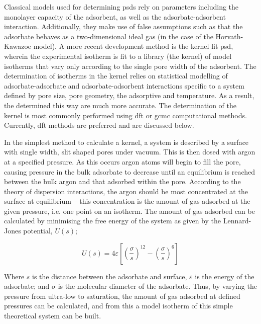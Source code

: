 Classical models used for determining \glspl{psd} rely on parameters including the monolayer capacity of the \gls{adsorbent}, as well as the \gls{adsorbate}-\gls{adsorbent} interaction. Additionally, they make use of false assumptions such as that the \gls{adsorbate} behaves as a two-dimensional ideal gas (in the case of the Horvath-Kawazoe model).\citep{Barrett1951determination, Horvath1983Method}  A more recent development method is the kernel fit \acrshort{psd}, wherein the experimental isotherm is fit to a library (the kernel) of model isotherms that vary only according to the single pore width of the \gls{adsorbent}.\citep{Thommes2015Physisorption, tan1990adsorption, sosin1995using, tarazona1987phase} The determination of isotherms in the kernel relies on statistical modelling of \gls{adsorbate}-\gls{adsorbate} and \gls{adsorbate}-\gls{adsorbent} interactions specific to a system defined by pore size, pore geometry, the adsorptive and temperature. As a result, the  determined this way are much more accurate. The determination of the kernel is most commonly performed using \acrfull{dft} or \acrfull{gcmc} computational methods. Currently, \acrshort{dft} methods are preferred and are discussed below.

In the simplest method to calculate a kernel, a system is described by a surface with single width, slit shaped pores under vacuum. This is then dosed with argon at a specified pressure. As this occurs argon atoms will begin to fill the pore, causing pressure in the bulk \gls{adsorbate} to decrease until an equilibrium is reached between the bulk argon and that adsorbed within the pore. According to the theory of dispersion interactions, the argon should be most concentrated at the surface at equilibrium – this concentration is the amount of gas adsorbed at the given pressure, i.e. one point on an isotherm. The amount of gas adsorbed can be calculated by minimising the free energy of the system as given by the Lennard-Jones potential, $U(s)$;

\begin{equation}
U(s) = 4\varepsilon \left[ \left(\frac{\sigma}{s}\right)^{12} -  \left(\frac{\sigma}{s}\right)^{6} \right]
\end{equation}

Where $s$ is the distance between the \gls{adsorbate} and surface, $\varepsilon$ is the energy of the \gls{adsorbate}; and $\sigma$ is the molecular diameter of the \gls{adsorbate}.  Thus, by varying the pressure from ultra-low to saturation, the amount of gas adsorbed at defined pressures can be calculated, and from this a model isotherm of this simple theoretical system can be built. 

